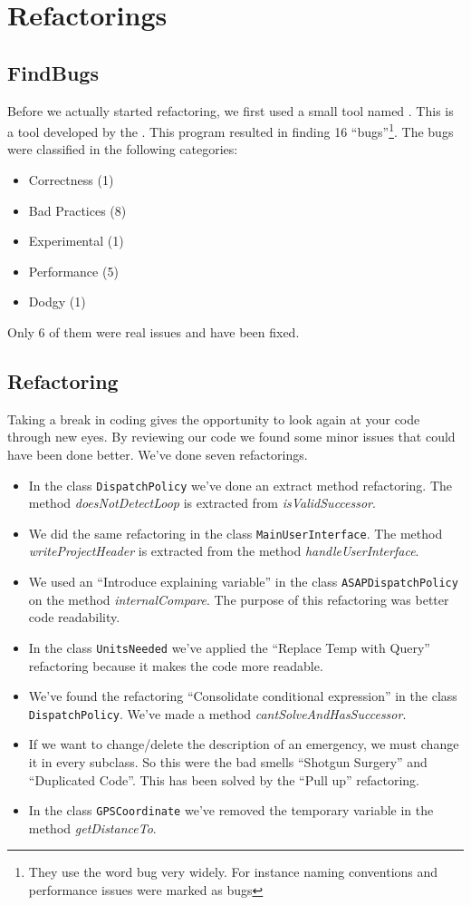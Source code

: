 \section{Refactorings}
\subsection{FindBugs}
Before we actually started refactoring, we first used a small tool named . This is a tool developed by the . This program resulted in finding 16 ``bugs''\footnote{They use the word bug very widely. For instance naming conventions and performance issues were marked as bugs}. The bugs were classified in the following categories:
\begin{itemize}
 \item Correctness (1)
 \item Bad Practices (8)
 \item Experimental (1)
 \item Performance (5)
 \item Dodgy (1)
\end{itemize}
Only 6 of them were real issues and have been fixed.
\subsection{Refactoring}
Taking a break in coding gives the opportunity to look again at your code through new eyes. By reviewing our code we found some minor issues that could have been done better. We've done seven refactorings.
\begin{itemize}
	\item In the class \texttt{DispatchPolicy} we've done an extract method refactoring. The method \textit{doesNotDetectLoop} is extracted from \textit{isValidSuccessor}.
	\item We did the same refactoring in the class \texttt{MainUserInterface}. The method \textit{writeProjectHeader} is extracted from the method \textit{handleUserInterface}.
	\item We used an ``Introduce explaining variable'' in the class \texttt{ASAPDispatchPolicy} on the method \textit{internalCompare}. The purpose of this refactoring was better code readability.
	\item In the class \texttt{UnitsNeeded} we've applied the ``Replace Temp with Query'' refactoring because it makes the code more readable.
	\item We've found the refactoring ``Consolidate conditional expression'' in the class \texttt{DispatchPolicy}. We've made a method \textit{cantSolveAndHasSuccessor}.
	\item If we want to change/delete the description of an emergency, we must change it in every subclass. So this were the bad smells ``Shotgun Surgery'' and ``Duplicated Code''. This has been solved by the ``Pull up'' refactoring.
	\item In the class \texttt{GPSCoordinate} we've removed the temporary variable in the method \textit{getDistanceTo}.
\end{itemize}

